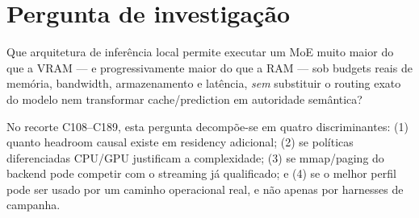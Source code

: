 \section{Pergunta de investigação}
Que arquitetura de inferência local permite executar um MoE muito maior do que a VRAM --- e progressivamente maior do que a RAM --- sob budgets reais de memória, bandwidth, armazenamento e latência, \emph{sem} substituir o routing exato do modelo nem transformar cache/prediction em autoridade semântica?

No recorte C108--C189, esta pergunta decompõe-se em quatro discriminantes: (1) quanto headroom causal existe em residency adicional; (2) se políticas diferenciadas CPU/GPU justificam a complexidade; (3) se mmap/paging do backend pode competir com o streaming já qualificado; e (4) se o melhor perfil pode ser usado por um caminho operacional real, e não apenas por harnesses de campanha.
